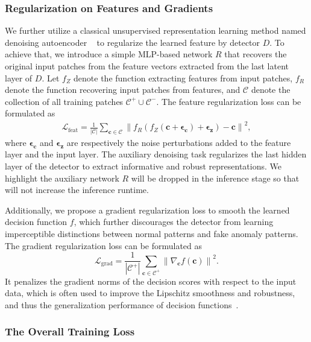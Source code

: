 \documentclass[letterpaper]{article} %
\begin{document}
\subsubsection{Regularization on Features and Gradients}
We further utilize a classical unsupervised representation learning method named denoising autoencoder ~\cite{DAE} to regularize the learned feature by detector $D$. To achieve that, we introduce a simple MLP-based network $R$ that recovers the original input patches from the feature vectors extracted from the last latent layer of $D$. Let $f_{Z}$ denote the function extracting features from input patches, $f_{R}$ denote the function recovering input patches from features, and $\mathcal{C}$ denote the collection of all training patches $\mathcal{C}^+\!\cup\!\mathcal{C}^-$. The feature regularization loss can be formulated as
\begin{equation}
    \begin{aligned}
	    \mathcal{L}_{\mathrm{feat}}= \frac{1}{|\mathcal{C}|}\sum_{\bm{c}\in \mathcal{C}} \left\|f_{R}(f_{Z}(\bm{c}+\bm{\epsilon_c})+\bm{\epsilon_z}) - \bm{c}\right\|^2,
     \end{aligned}
\end{equation}
where $\bm{\epsilon_c}$ and $\bm{\epsilon_z}$ are respectively the noise perturbations added to the feature layer and the input layer. The auxiliary denoising task regularizes the last hidden layer of the detector to extract informative and robust representations. We highlight the auxiliary network $R$ will be dropped in the inference stage so that will not increase the inference runtime.

Additionally, we propose a gradient regularization loss to smooth the learned decision function $f$, which further discourages the detector from learning imperceptible distinctions between normal patterns and fake anomaly patterns. The gradient regularization loss can be formulated as
\begin{equation}
    \mathcal{L}_{\mathrm{grad}}=\frac{1}{|\mathcal{C}^+|}\sum_{\bm{c}\in \mathcal{C}^+} \left\|\nabla_{\bm{c}} f(\bm{c})\right\|^{2}.
    \label{eq_gp}
\end{equation}
It penalizes the gradient norms of the decision scores with respect to the input data, which is often used to improve the Lipschitz smoothness and robustness, and thus the generalization performance of decision functions~\cite{GradPU, arjovsky2017towards,inputGrad}. 
\subsubsection{The Overall Training Loss}
\end{document}
